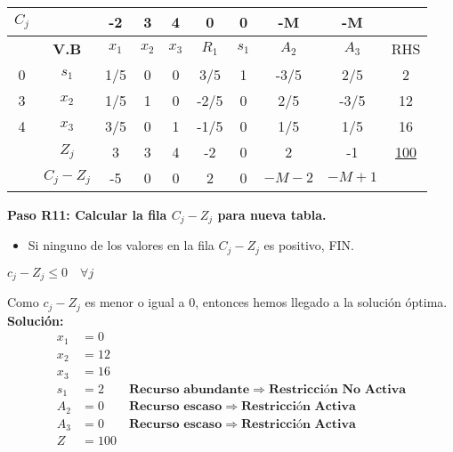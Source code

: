 \documentclass{templateNote}
\begin{document}
\newpage
\begin{center}
    \begin{tabular}{|c|c|c|c|c|c|c|c|c|c|}
        \hline
        $C_j$ & & -2 & 3 & 4 & 0 & 0 & -M & -M & \\ \hline
        & \textbf{V.B} & $x_1$ & $x_2$ & $x_3$ & $R_1$ & $s_1$ & $A_2$ & $A_3$ & RHS \\ \hline
        0 & $s_1$ & 1/5 & 0 & 0 & 3/5 & 1 & -3/5 & 2/5 & 2 \\ \hline
        3 & $x_2$ & 1/5 & 1 & 0 & -2/5 & 0 & 2/5 & -3/5 & 12 \\ \hline
        4 & $x_3$ & 3/5 & 0 & 1 & -1/5 & 0 & 1/5 & 1/5 & 16 \\ \hline
        & $Z_j$ & 3 & 3 & 4 & -2 & 0 & 2 & -1 & \underline{100} \\ \hline
        & $C_j - Z_j$ & -5 & 0 & 0 & 2 & 0 & $-M-2$ & $-M+1$ & \\ \hline
    \end{tabular}
\end{center}
\textbf{Paso R11: Calcular la fila $C_j - Z_j$ para nueva tabla.}
\begin{itemize}
    \item Si ninguno de los valores en la fila $C_j - Z_j$ es positivo,  FIN.
\end{itemize}
\begin{center}
    $c_j - Z_j \leq 0 \quad \forall j$
\end{center}

Como $c_j - Z_j$ es menor o igual a 0, entonces hemos llegado a la solución óptima.
\textbf{Solución:}
\begin{align*}
    x_1 &= 0 \\
    x_2 &= 12 \\
    x_3 &= 16 \\
    s_1 &= 2 \qquad \textbf{Recurso abundante} \Rightarrow \textbf{Restricción No Activa}\\
    A_2 &= 0 \qquad \textbf{Recurso escaso} \Rightarrow \textbf{Restricción Activa}\\
    A_3 &= 0 \qquad \textbf{Recurso escaso} \Rightarrow \textbf{Restricción Activa}\\
    Z &= 100
\end{align*}
\end{document}
